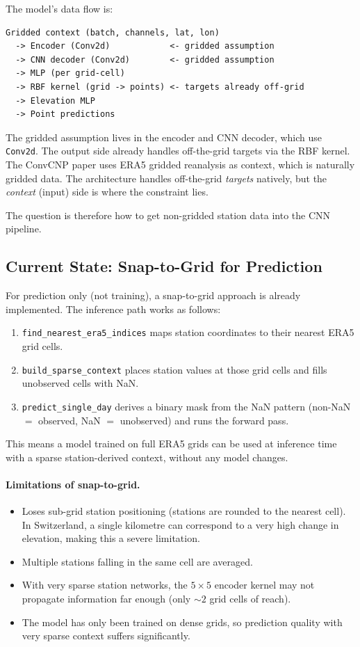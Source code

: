The model's data flow is:

\begin{verbatim}
Gridded context (batch, channels, lat, lon)
  -> Encoder (Conv2d)            <- gridded assumption
  -> CNN decoder (Conv2d)        <- gridded assumption
  -> MLP (per grid-cell)
  -> RBF kernel (grid -> points) <- targets already off-grid
  -> Elevation MLP
  -> Point predictions
\end{verbatim}

The gridded assumption lives in the encoder and CNN decoder, which use \texttt{Conv2d}. The output side already handles off-the-grid targets via the RBF kernel. The ConvCNP paper \citep{vaughan2022} uses ERA5 gridded reanalysis as context, which is naturally gridded data. The architecture handles off-the-grid \emph{targets} natively, but the \emph{context} (input) side is where the constraint lies.

The question is therefore how to get non-gridded station data into the CNN pipeline.

\subsection{Current State: Snap-to-Grid for Prediction}

For prediction only (not training), a snap-to-grid approach is already implemented. The inference path works as follows:

\begin{enumerate}
    \item \texttt{find\_nearest\_era5\_indices} maps station coordinates to their nearest ERA5 grid cells.
    \item \texttt{build\_sparse\_context} places station values at those grid cells and fills unobserved cells with NaN.
    \item \texttt{predict\_single\_day} derives a binary mask from the NaN pattern (non-NaN $=$ observed, NaN $=$ unobserved) and runs the forward pass.
\end{enumerate}

This means a model trained on full ERA5 grids can be used at inference time with a sparse station-derived context, without any model changes.

\paragraph{Limitations of snap-to-grid.}
\begin{itemize}
    \item Loses sub-grid station positioning (stations are rounded to the nearest cell). In Switzerland, a single kilometre can correspond to a very high change in elevation, making this a severe limitation.
    \item Multiple stations falling in the same cell are averaged.
    \item With very sparse station networks, the $5 \times 5$ encoder kernel may not propagate information far enough (only ${\sim}2$ grid cells of reach).
    \item The model has only been trained on dense grids, so prediction quality with very sparse context suffers significantly.
\end{itemize}

